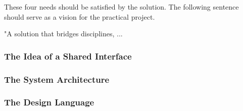 These four needs should be satisfied by the solution. The following sentence should serve as a
vision for the practical project.

"A solution that bridges disciplines, ... %

\subsubsection{The Idea of a Shared Interface}

\subsubsection{The System Architecture}

\subsubsection{The Design Language}